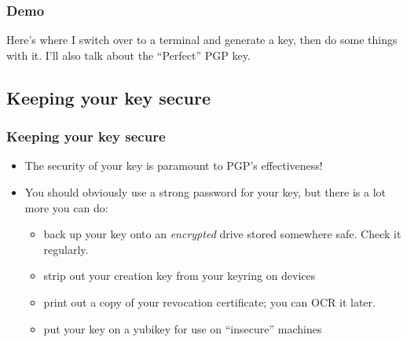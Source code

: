 \documentclass[aspectratio=1610,bigger,utf8]{beamer}
\begin{document}
\begin{frame}
	\frametitle{Demo}
	Here's where I switch over to a terminal and generate a key, then do
	some things with it. I'll also talk about the ``Perfect'' PGP key.
\end{frame}
\subsection{Keeping your key secure}
\begin{frame}
	\frametitle{Keeping your key secure}
	\begin{itemize}
		\item The security of your key is paramount to PGP's
			effectiveness!
		\item You should obviously use a strong password for your key,
			but there is a lot more you can do:
			\begin{itemize}
				\item back up your key onto an \emph{encrypted}
					drive stored somewhere safe. Check it
					regularly.
				\item strip out your creation key from your
					keyring on devices
				\item print out a copy of your revocation
					certificate; you can OCR it later.
				\item put your key on a yubikey for use on
					``insecure'' machines
			\end{itemize}
	\end{itemize}
\end{frame}
\end{document}
